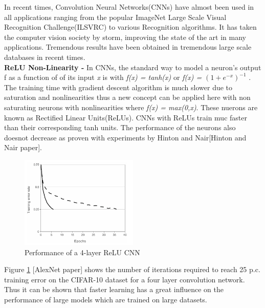 In recent times, Convolution Neural Networks(CNNs) have almost been used in all applications ranging from the popular ImageNet Large Scale Visual Recognition Challenge(ILSVRC) to various Recognition algorithms. It has taken the computer vision society by storm, improving the state of the art in many applications. Tremendous results have been obtained in tremendous large scale databases in recent times. \\

\textbf{ReLU Non-Linearity - } In CNNs, the standard way to model a neuron's output f as a function of of its input \textit{x} is with \textit{f(x) = tanh(x)} or \textit{f(x) = $(1+e^{-x})^{-1}$} . The training time with gradient descent algorithm is much slower due to saturation and nonlinearities thus a new concept can be applied here with non saturating neurons with nonlinearities where \textit{f(x) = max(0,x)}. These nuerons are known as Rectified Linear Units(ReLUs). CNNs with ReLUs train muc faster than their corresponding tanh units. The performance of the neurons also doesnot decrease as proven with experiments by Hinton and Nair[Hinton and Nair paper]. 

\begin{figure}
	\begin{center}
		\includegraphics[width=0.5\textwidth]{Figures/Figure21}
	\end{center}
	\caption{Performance of a 4-layer ReLU CNN}
	\label{fig:Figure21}
\end{figure}

Figure \ref{fig:Figure21} [AlexNet paper] shows the number of iterations required to reach 25 p.c. training error on the CIFAR-10 dataset for a four layer convolution network. Thus it can be shown that faster learning has a great influence on the performance of large models which are trained on large datasets.

